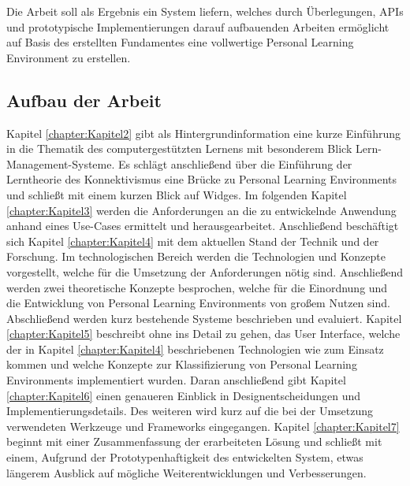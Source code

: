 Die Arbeit soll als Ergebnis ein System liefern, welches durch Überlegungen, APIs und prototypische Implementierungen darauf aufbauenden Arbeiten ermöglicht auf Basis des erstellten Fundamentes eine vollwertige Personal Learning Environment zu erstellen.

\subsection{Aufbau der Arbeit}
Kapitel \ref{chapter:Kapitel2} gibt als Hintergrundinformation eine kurze Einführung in die Thematik des computergestützten Lernens mit besonderem Blick Lern-Management-Systeme. Es schlägt anschließend über die Einführung der Lerntheorie des Konnektivismus eine Brücke zu Personal Learning Environments und schließt mit einem kurzen Blick auf Widges. Im folgenden Kapitel \ref{chapter:Kapitel3} werden die Anforderungen an die zu entwickelnde Anwendung anhand eines Use-Cases ermittelt und herausgearbeitet. Anschließend beschäftigt sich Kapitel \ref{chapter:Kapitel4} mit dem aktuellen Stand der Technik und der Forschung. Im technologischen Bereich werden die Technologien und Konzepte vorgestellt, welche für die Umsetzung der Anforderungen nötig sind. Anschließend werden zwei theoretische Konzepte besprochen, welche für die Einordnung und die Entwicklung von Personal Learning Environments von großem Nutzen sind. Abschließend werden kurz bestehende Systeme beschrieben und evaluiert. Kapitel \ref{chapter:Kapitel5} beschreibt ohne ins Detail zu gehen, das User Interface, welche der in Kapitel \ref{chapter:Kapitel4} beschriebenen Technologien wie zum Einsatz kommen und welche Konzepte zur Klassifizierung von Personal Learning Environments implementiert wurden. Daran anschließend gibt Kapitel \ref{chapter:Kapitel6} einen genaueren Einblick in Designentscheidungen und Implementierungsdetails. Des weiteren wird kurz auf die bei der Umsetzung verwendeten Werkzeuge und Frameworks eingegangen. Kapitel \ref{chapter:Kapitel7} beginnt mit einer Zusammenfassung der erarbeiteten Lösung und schließt mit einem, Aufgrund der Prototypenhaftigkeit des entwickelten System, etwas längerem Ausblick auf mögliche Weiterentwicklungen und Verbesserungen.
